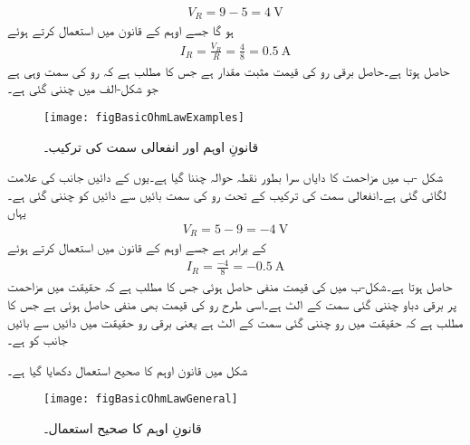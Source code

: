 \begin{align*}
V_R=9-5=\SI{4}{\volt}
\end{align*}  
ہو گا جسے اوہم کے قانون میں استعمال کرتے ہوئے
\begin{align*}
I_R=\frac{V_R}{R}=\frac{4}{8}=\SI{0.5}{\ampere}
\end{align*}
حاصل ہوتا ہے۔حاصل برقی رو کی قیمت مثبت مقدار ہے جس کا مطلب ہے  کہ رو کی سمت وہی ہے جو شکل-الف میں چننی گئی ہے۔


\begin{figure}
\centering
\texttt{[image: figBasicOhmLawExamples]}
\caption{قانونِ اوہم اور انفعالی سمت کی ترکیب۔}
\label{شکل_بنیادی_قانون_اوہم_اور_غیر_عامل_ترکیب}
\end{figure}

شکل -ب میں مزاحمت کا دایاں سرا بطور نقطہ حوالہ چننا گیا ہے۔یوں  کے دائیں جانب  کی علامت لگائی گئی ہے۔انفعالی سمت کی ترکیب کے تحت رو کی سمت بائیں سے دائیں کو چننی گئی ہے۔یہاں
\begin{align*}
V_R=5-9=\SI{-4}{\volt}
\end{align*}
کے برابر ہے جسے اوہم کے قانون میں استعمال کرتے ہوئے
\begin{align*}
I_R=\frac{-4}{8}=\SI{-0.5}{\ampere}
\end{align*}
حاصل ہوتا ہے۔شکل-ب میں  کی قیمت منفی حاصل ہوئی جس کا مطلب ہے کہ حقیقت میں مزاحمت پر برقی دباو چننی گئی سمت کے الٹ ہے۔اسی طرح رو  کی قیمت بھی منفی حاصل ہوئی ہے جس کا مطلب ہے کہ حقیقت میں رو چننی گئی سمت کے الٹ ہے یعنی برقی رو حقیقت میں دائیں سے بائیں جانب کو ہے۔

شکل  میں قانون اوہم کا صحیح استعمال دکھایا گیا ہے۔



\begin{figure}
\centering
\texttt{[image: figBasicOhmLawGeneral]}
\caption{قانونِ اوہم کا صحیح استعمال۔ }
\label{شکل_بنیادی_قانون_اوہم_صحیح_استعمال}
\end{figure}


